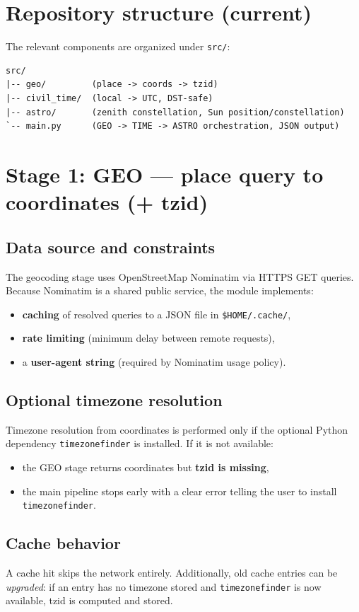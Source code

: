 \documentclass[11pt,a4paper]{article}
\begin{document}
\section{Repository structure (current)}
The relevant components are organized under \texttt{src/}:
\begin{verbatim}
src/
|-- geo/         (place -> coords -> tzid)
|-- civil_time/  (local -> UTC, DST-safe)
|-- astro/       (zenith constellation, Sun position/constellation)
`-- main.py      (GEO -> TIME -> ASTRO orchestration, JSON output)
\end{verbatim}

\section{Stage 1: GEO --- place query to coordinates (+ tzid)}
\subsection{Data source and constraints}
The geocoding stage uses OpenStreetMap Nominatim via HTTPS GET queries.
Because Nominatim is a shared public service, the module implements:
\begin{itemize}
  \item \textbf{caching} of resolved queries to a JSON file in \texttt{\$HOME/.cache/},
  \item \textbf{rate limiting} (minimum delay between remote requests),
  \item a \textbf{user-agent string} (required by Nominatim usage policy).
\end{itemize}

\subsection{Optional timezone resolution}
Timezone resolution from coordinates is performed only if the optional Python dependency
\texttt{timezonefinder} is installed. If it is not available:
\begin{itemize}
  \item the GEO stage returns coordinates but \textbf{tzid is missing},
  \item the main pipeline stops early with a clear error telling the user to install \texttt{timezonefinder}.
\end{itemize}

\subsection{Cache behavior}
A cache hit skips the network entirely. Additionally, old cache entries can be \emph{upgraded}:
if an entry has no timezone stored and \texttt{timezonefinder} is now available, tzid is computed and stored.
\end{document}
